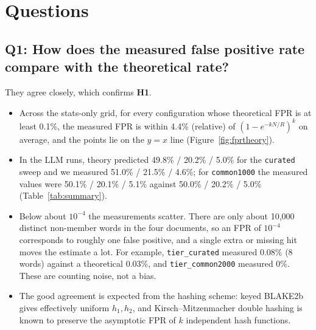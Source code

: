 \documentclass[11pt]{article}
\newcommand{\code}[1]{\texttt{#1}}
\begin{document}
\section{Questions}
\label{sec:questions}

\subsection{Q1: How does the measured false positive rate compare with the theoretical rate?}
They agree closely, which confirms \textbf{H1}.
\begin{itemize}
  \item Across the stats-only grid, for every configuration whose theoretical FPR is at least 0.1\%,
        the measured FPR is within 4.4\% (relative) of $(1-e^{-kN/R})^k$ on average, and the points
        lie on the $y=x$ line (Figure~\ref{fig:fprtheory}).
  \item In the LLM runs, theory predicted 49.8\% / 20.2\% / 5.0\% for the \code{curated} sweep and we
        measured 51.0\% / 21.5\% / 4.6\%; for \code{common1000} the measured values were 50.1\% /
        20.1\% / 5.1\% against 50.0\% / 20.2\% / 5.0\% (Table~\ref{tab:summary}).
  \item Below about $10^{-4}$ the measurements scatter. There are only about 10{,}000 distinct
        non-member words in the four documents, so an FPR of $10^{-4}$ corresponds to roughly one
        false positive, and a single extra or missing hit moves the estimate a lot. For example,
        \code{tier\_curated} measured 0.08\% (8 words) against a theoretical 0.03\%, and
        \code{tier\_common2000} measured 0\%. These are counting noise, not a bias.
  \item The good agreement is expected from the hashing scheme: keyed BLAKE2b gives effectively
        uniform $h_1,h_2$, and Kirsch--Mitzenmacher double hashing is known to preserve the
        asymptotic FPR of $k$ independent hash functions.
\end{itemize}

\end{document}
